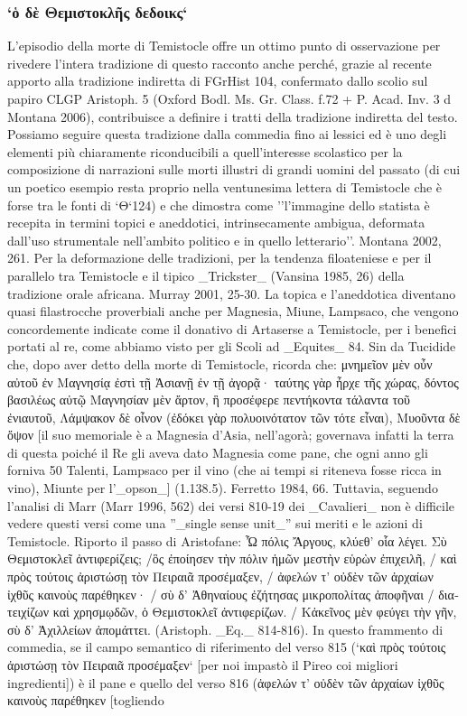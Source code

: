 {            \subsubsection{`ὁ δὲ Θεμιστοκλῆς δεδοικς`}
            L'episodio della morte di Temistocle offre un ottimo punto di osservazione per rivedere l'intera tradizione di questo racconto anche perché, grazie al recente apporto alla tradizione indiretta di FGrHist 104, confermato dallo scolio sul papiro CLGP Aristoph. 5 (Oxford Bodl. Ms. Gr. Class. f.72 + P. Acad. Inv. 3 d Montana 2006), contribuisce a definire i tratti della tradizione indiretta del testo. Possiamo seguire questa tradizione dalla commedia fino ai lessici ed è uno degli elementi più chiaramente riconducibili a quell'interesse scolastico per la composizione di narrazioni sulle morti illustri di grandi uomini del passato (di cui un poetico esempio resta proprio nella ventunesima lettera di Temistocle che è forse tra le fonti di `Θ`124) e che dimostra come ''l'immagine dello statista è recepita in termini topici e aneddotici, intrinsecamente ambigua, deformata dall'uso strumentale nell'ambito politico e in quello letterario''. Montana 2002, 261. Per la deformazione delle tradizioni, per la tendenza filoateniese e per il parallelo tra Temistocle e il tipico _Trickster_ (Vansina 1985, 26) della tradizione orale africana. Murray 2001, 25-30. La topica e l'aneddotica diventano quasi filastrocche proverbiali anche per Magnesia, Miune, Lampsaco, che vengono concordemente indicate come il donativo di Artaserse  a Temistocle, per i benefici portati al re, come abbiamo visto per gli Scoli ad _Equites_ 84. Sin da Tucidide che, dopo aver detto della morte di Temistocle, ricorda che: \textgreek{μνημεῖον μὲν οὖν αὐτοῦ ἐν Μαγνησίᾳ ἐστὶ τῇ Ἀσιανῇ ἐν τῇ ἀγορᾷ· ταύτης γὰρ ἦρχε τῆς χώρας, δόντος βασιλέως αὐτῷ Μαγνησίαν μὲν ἄρτον, ἣ προσέφερε πεντήκοντα τάλαντα τοῦ ἐνιαυτοῦ, Λάμψακον δὲ οἶνον (ἐδόκει γὰρ πολυοινότατον τῶν τότε εἶναι), Μυοῦντα δὲ ὄψον} [il suo memoriale è a Magnesia d'Asia, nell'agorà; governava infatti la terra di questa poiché il Re gli aveva dato Magnesia come pane, che ogni anno gli forniva 50 Talenti, Lampsaco per il vino (che ai tempi si riteneva fosse ricca in vino), Miunte per l'_opson_] (1.138.5). Ferretto 1984, 66. Tuttavia, seguendo l'analisi di Marr (Marr 1996, 562) dei versi 810-19 dei _Cavalieri_  non è difficile vedere questi versi come una ''_single sense unit_'' sui meriti e le azioni di Temistocle. Riporto il passo di Aristofane: \textgreek{Ὦ πόλις Ἄργους, κλύεθ’ οἷα λέγει. Σὺ Θεμιστοκλεῖ ἀντιφερίζεις; /ὃς ἐποίησεν τὴν πόλιν ἡμῶν μεστὴν εὑρὼν ἐπιχειλῆ, / καὶ πρὸς τούτοις ἀριστώσῃ τὸν Πειραιᾶ προσέμαξεν, / ἀφελών τ’ οὐδὲν τῶν ἀρχαίων ἰχθῦς καινοὺς παρέθηκεν· / σὺ δ’ Ἀθηναίους ἐζήτησας μικροπολίτας ἀποφῆναι / διατειχίζων καὶ χρησμῳδῶν, ὁ Θεμιστοκλεῖ ἀντιφερίζων.  / Κἀκεῖνος μὲν φεύγει τὴν γῆν, σὺ δ’ Ἀχιλλείων ἀπομάττει.} (Aristoph. _Eq._ 814-816). In questo frammento di commedia, se il campo semantico di riferimento del verso 815 (`καὶ πρὸς τούτοις ἀριστώσῃ τὸν Πειραιᾶ προσέμαξεν` [per noi impastò il Pireo coi migliori ingredienti]) è il pane e quello del verso 816 (\textgreek{ἀφελών τ’ οὐδὲν τῶν ἀρχαίων ἰχθῦς καινοὺς παρέθηκεν} [togliendo }
